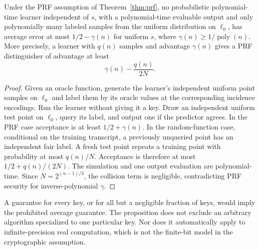 \begin{samepage}
\begin{proposition}\label{prop:hiddenkey}
Under the PRF assumption of Theorem~\ref{thm:prf}, no probabilistic polynomial-time learner independent of $s$, with a polynomial-time evaluable output and only polynomially many labeled samples from the uniform distribution on $\ell_0$, has average error at most $1/2-\gamma(n)$ for uniform $s$, where $\gamma(n)\ge1/\operatorname{poly}(n)$. More precisely, a learner with $q(n)$ samples and advantage $\gamma(n)$ gives a PRF distinguisher of advantage at least
\[
 \gamma(n)-\frac{q(n)}{2N}.
\]
\end{proposition}
\end{samepage}
\begin{proof}
Given an oracle function, generate the learner's independent uniform point samples on $\ell_0$ and label them by its oracle values at the corresponding incidence encodings. Run the learner without giving it a key. Draw an independent uniform test point on $\ell_0$, query its label, and output one if the predictor agrees. In the PRF case acceptance is at least $1/2+\gamma(n)$. In the random-function case, conditional on the training transcript, a previously unqueried point has an independent fair label. A fresh test point repeats a training point with probability at most $q(n)/N$. Acceptance is therefore at most $1/2+q(n)/(2N)$. The simulation and one output evaluation are polynomial-time. Since $N=2^{(n-1)/3}$, the collision term is negligible, contradicting PRF security for inverse-polynomial $\gamma$.
\end{proof}

A guarantee for every key, or for all but a negligible fraction of keys, would imply the prohibited average guarantee. The proposition does not exclude an arbitrary algorithm specialized to one particular key. Nor does it automatically apply to infinite-precision real computation, which is not the finite-bit model in the cryptographic assumption.

